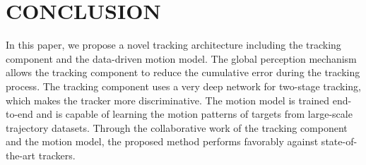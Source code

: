 \section{CONCLUSION}
\label{sec:conclusion}

In this paper, we propose a novel tracking architecture including the tracking component and the data-driven motion model. The global perception mechanism allows the tracking component to reduce the cumulative error during the tracking process. The tracking component uses a very deep network for two-stage tracking, which makes the tracker more discriminative. The motion model is trained end-to-end and is capable of learning the motion patterns of targets from large-scale trajectory datasets. Through the collaborative work of the tracking component and the motion model, the proposed method performs favorably against state-of-the-art trackers.